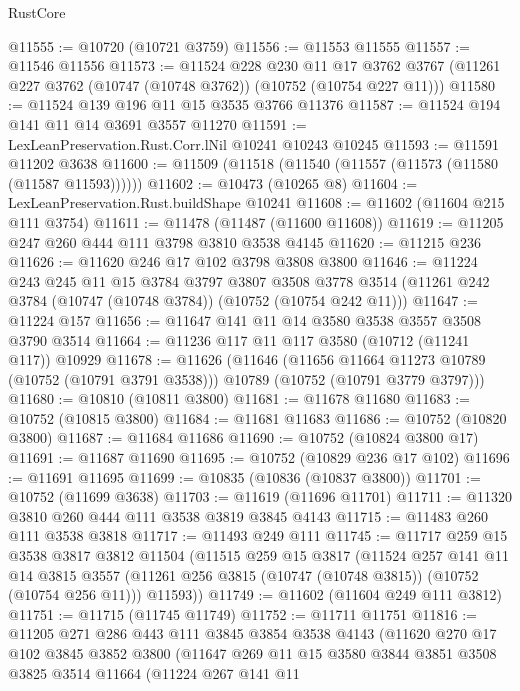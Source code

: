 \begin{lexlean}{RustCore}
\begin{coremodule}
@11555 := @10720 (@10721 @3759)
@11556 := @11553 @11555
@11557 := @11546 @11556
@11573 := @11524
    @228
    @230
    @11
    @17
    @3762
    @3767
    (@11261 @227 @3762 (@10747 (@10748 @3762)) (@10752 (@10754 @227 @11)))
@11580 := @11524 @139 @196 @11 @15 @3535 @3766 @11376
@11587 := @11524 @194 @141 @11 @14 @3691 @3557 @11270
@11591 := LexLeanPreservation.Rust.Corr.lNil @10241 @10243 @10245
@11593 := @11591 @11202 @3638
@11600 := @11509 (@11518 (@11540 (@11557 (@11573 (@11580 (@11587 @11593))))))
@11602 := @10473 (@10265 @8)
@11604 := LexLeanPreservation.Rust.buildShape @10241
@11608 := @11602 (@11604 @215 @111 @3754)
@11611 := @11478 (@11487 (@11600 @11608))
@11619 := @11205 @247 @260 @444 @111 @3798 @3810 @3538 @4145
@11620 := @11215 @236
@11626 := @11620 @246 @17 @102 @3798 @3808 @3800
@11646 := @11224
    @243
    @245
    @11
    @15
    @3784
    @3797
    @3807
    @3508
    @3778
    @3514
    (@11261 @242 @3784 (@10747 (@10748 @3784)) (@10752 (@10754 @242 @11)))
@11647 := @11224 @157
@11656 := @11647 @141 @11 @14 @3580 @3538 @3557 @3508 @3790 @3514
@11664 := @11236 @117 @11 @117 @3580 (@10712 (@11241 @117)) @10929
@11678 := @11626
    (@11646
      (@11656 @11664 @11273 @10789 (@10752 (@10791 @3791 @3538)))
      @10789
      (@10752 (@10791 @3779 @3797)))
@11680 := @10810 (@10811 @3800)
@11681 := @11678 @11680
@11683 := @10752 (@10815 @3800)
@11684 := @11681 @11683
@11686 := @10752 (@10820 @3800)
@11687 := @11684 @11686
@11690 := @10752 (@10824 @3800 @17)
@11691 := @11687 @11690
@11695 := @10752 (@10829 @236 @17 @102)
@11696 := @11691 @11695
@11699 := @10835 (@10836 (@10837 @3800))
@11701 := @10752 (@11699 @3638)
@11703 := @11619 (@11696 @11701)
@11711 := @11320 @3810 @260 @444 @111 @3538 @3819 @3845 @4143
@11715 := @11483 @260 @111 @3538 @3818
@11717 := @11493 @249 @111
@11745 := @11717
    @259
    @15
    @3538
    @3817
    @3812
    @11504
    (@11515
      @259
      @15
      @3817
      (@11524
        @257
        @141
        @11
        @14
        @3815
        @3557
        (@11261 @256 @3815 (@10747 (@10748 @3815)) (@10752 (@10754 @256 @11)))
        @11593))
@11749 := @11602 (@11604 @249 @111 @3812)
@11751 := @11715 (@11745 @11749)
@11752 := @11711 @11751
@11816 := @11205
    @271
    @286
    @443
    @111
    @3845
    @3854
    @3538
    @4143
    (@11620
      @270
      @17
      @102
      @3845
      @3852
      @3800
      (@11647
        @269
        @11
        @15
        @3580
        @3844
        @3851
        @3508
        @3825
        @3514
        @11664
        (@11224
          @267
          @141
          @11

\end{coremodule}
\end{lexlean}

